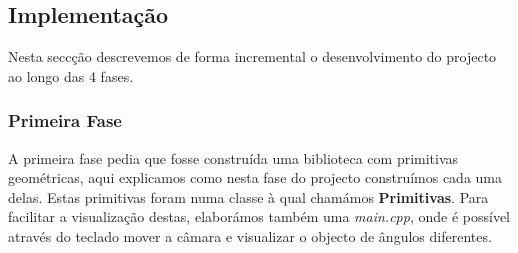 \documentclass[a5paper,onecolumn, 11pt]{article}
\begin{document}
\subsection{Implementação}
Nesta seccção descrevemos de forma incremental o desenvolvimento do projecto ao longo das 4 fases.
\subsubsection{Primeira Fase}
A  primeira fase  pedia que fosse construída uma biblioteca com primitivas  geométricas, aqui explicamos  como nesta fase do projecto construímos cada uma delas. Estas primitivas foram numa classe à qual chamámos \textbf{Primitivas}. Para facilitar a visualização destas, elaborámos também uma \textit{main.cpp}, onde é possível através do teclado mover a câmara e visualizar o objecto de ângulos diferentes.
\end{document}

